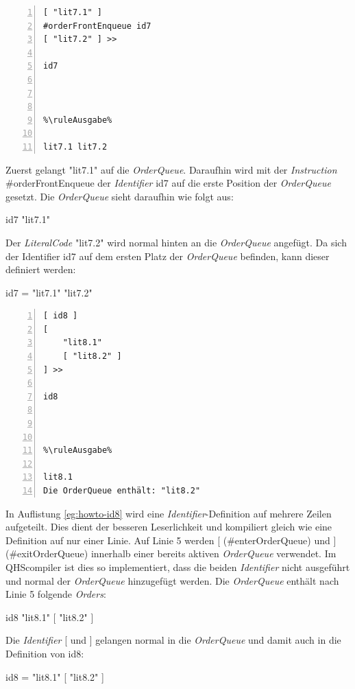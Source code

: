 \begin{minipage}{\linewidth}
\begin{multicols}{2}
\begin{lstlisting}[language=QHS, caption=Beispiel zu {\selectListingFont \#orderFrontEnqueue}, numbers=left, stepnumber=1]
%\ruleEingabe%
[ "lit7.1" ]
#orderFrontEnqueue id7
[ "lit7.2" ] >>

id7



%\ruleAusgabe%

lit7.1 lit7.2
\end{lstlisting}
\columnbreak
Zuerst gelangt {\selectListingFont "lit7.1"{}} auf die \textit{OrderQueue}.
Daraufhin wird mit der \textit{Instruction} {\selectListingFont \#orderFrontEnqueue} der \textit{Identifier} {\selectListingFont id7} auf die erste Position der \textit{OrderQueue} gesetzt.
Die \textit{OrderQueue} sieht daraufhin wie folgt aus:
\centerline{\selectListingFont id7 "lit7.1"{}}
Der \textit{LiteralCode} {\selectListingFont "lit7.2"{}} wird normal hinten an die \textit{OrderQueue} angefügt.
Da sich der Identifier {\selectListingFont id7} auf dem ersten Platz der \textit{OrderQueue} befinden, kann dieser definiert werden: \break
\centerline{\selectListingFont id7 = "lit7.1"{} "lit7.2"{}}
\end{multicols}
\end{minipage}
\vspace{\baselineskip}

\begin{minipage}{\linewidth}
\begin{multicols}{2}
\begin{lstlisting}[language=QHS, label=eg:howto-id8, caption=Beispiel zu doppelter Aktivierung der \textit{OrderQueue}, numbers=left, stepnumber=1]
%\ruleEingabe%
[ id8 ]
[
    "lit8.1"
    [ "lit8.2" ]
] >>

id8



%\ruleAusgabe%

lit8.1
Die OrderQueue enthält: "lit8.2"
\end{lstlisting}
\columnbreak
In Auflistung \ref{eg:howto-id8} wird eine \textit{Identifier}-Definition auf mehrere Zeilen aufgeteilt. Dies dient der besseren Leserlichkeit und kompiliert gleich wie eine Definition auf nur einer Linie.
Auf Linie 5 werden {\selectListingFont [} ({\selectListingFont \#enterOrderQueue}) und {\selectListingFont ]} ({\selectListingFont \#exitOrderQueue}) innerhalb einer bereits aktiven \textit{OrderQueue} verwendet.
Im QHScompiler ist dies so implementiert, dass die beiden \textit{Identifier} nicht ausgeführt und normal der \textit{OrderQueue} hinzugefügt werden. Die \textit{OrderQueue} enthält nach Linie 5 folgende \textit{Orders}: \break
\centerline{\selectListingFont id8 "lit8.1"{} [ "lit8.2"{} ] }
Die \textit{Identifier} {\selectListingFont [} und {\selectListingFont ]} gelangen normal in die \textit{OrderQueue} und damit auch in die Definition von {\selectListingFont id8}: \break
\centerline{\selectListingFont id8 = "lit8.1"{} [ "lit8.2"{} ] }
\end{multicols}
\end{minipage}
\vspace{\baselineskip}

